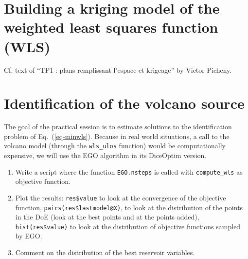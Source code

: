 \documentclass[12pt]{article}
\begin{document}
\section{Building a kriging model of the weighted least squares function (WLS)}

Cf. text of ``TP1 : plans remplissant l’espace et krigeage'' by Victor Picheny.

\section{Identification of the volcano source}
The goal of the practical session is to estimate solutions to the identification problem of Eq.~(\ref{eq-minwls}).
Because in real world situations, a call to the volcano model (through the \texttt{wls\_ulos} function) would be
computationally expensive, we will use the EGO algorithm \cite{Jones1998} in its DiceOptim version.
\begin{enumerate}
\item Write a script where the function \texttt{EGO.nsteps} is called with \texttt{compute\_wls} as objective function. 
\item Plot the results: \texttt{res\$value} to look at the convergence of the objective function, \texttt{pairs(res\$lastmodel@X)},
to look at the distribution of the points in the DoE (look at the best points and at the points added), 
\texttt{hist(res\$value)} to look at the distribution of objective functions sampled by EGO.
\item Comment on the distribution of the best reservoir variables.
\end{enumerate}
\end{document}
